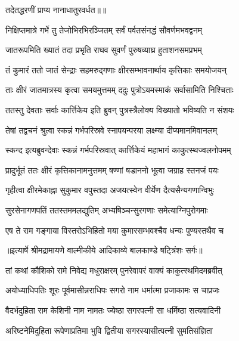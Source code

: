 {तदेतद्धरणीं प्राप्य नानाधातुरवर्धत॥॥} %

\addtocounter{shlokacount}{1}

\twolineshloka
{निक्षिप्तमात्रे गर्भे तु तेजोभिरभिरञ्जितम्}
{सर्वं पर्वतसंनद्धं सौवर्णमभवद्वनम्} %

\twolineshloka
{जातरूपमिति ख्यातं तदा प्रभृति राघव}
{सुवर्णं पुरुषव्याघ्र हुताशनसमप्रभम्} %

\twolineshloka
{तं कुमारं ततो जातं सेन्द्राः सहमरुद्गणाः}
{क्षीरसम्भावनार्थाय कृत्तिकाः समयोजयन्} %

\twolineshloka
{ताः क्षीरं जातमात्रस्य कृत्वा समयमुत्तमम्}
{ददुः पुत्रोऽयमस्माकं सर्वासामिति निश्चिताः} %

\twolineshloka
{ततस्तु देवताः सर्वाः कार्त्तिकेय इति ब्रुवन्}
{पुत्रस्त्रैलोक्य विख्यातो भविष्यति न संशयः} %

\twolineshloka
{तेषां तद्वचनं श्रुत्वा स्कन्नं गर्भपरिस्रवे}
{स्नापयन्परया लक्ष्म्या दीप्यमानमिवानलम्} %

\twolineshloka
{स्कन्द इत्यब्रुवन्देवाः स्कन्नं गर्भपरिस्रवात्}
{कार्त्तिकेयं महाभागं काकुत्स्थज्वलनोपमम्} %

\twolineshloka
{प्रादुर्भूतं ततः क्षीरं कृत्तिकानामनुत्तमम्}
{षण्णां षडाननो भूत्वा जग्राह स्तनजं पयः} %

\twolineshloka
{गृहीत्वा क्षीरमेकाह्ना सुकुमार वपुस्तदा}
{अजयत्स्वेन वीर्येण दैत्यसैन्यगणान्विभुः} %

\twolineshloka
{सुरसेनागणपतिं ततस्तममलद्युतिम्}
{अभ्यषिञ्चन्सुरगणाः समेत्याग्निपुरोगमाः} %

\twolineshloka
{एष ते राम गङ्गाया विस्तरोऽभिहितो मया}
{कुमारसम्भवश्चैव धन्यः पुण्यस्तथैव च} %


{॥इत्यार्षे श्रीमद्रामायणे वाल्मीकीये आदिकाव्ये बालकाण्डे षट्त्रिंशः सर्गः॥}


\twolineshloka
{तां कथां कौशिको रामे निवेद्य मधुराक्षरम्}
{पुनरेवापरं वाक्यं काकुत्स्थमिदमब्रवीत्} %

\twolineshloka
{अयोध्याधिपतिः शूरः पूर्वमासीन्नराधिपः}
{सगरो नाम धर्मात्मा प्रजाकामः स चाप्रजः} %

\twolineshloka
{वैदर्भदुहिता राम केशिनी नाम नामतः}
{ज्येष्ठा सगरपत्नी सा धर्मिष्ठा सत्यवादिनी} %

\twolineshloka
{अरिष्टनेमिदुहिता रूपेणाप्रतिमा भुवि}
{द्वितीया सगरस्यासीत्पत्नी सुमतिसंज्ञिता} %

